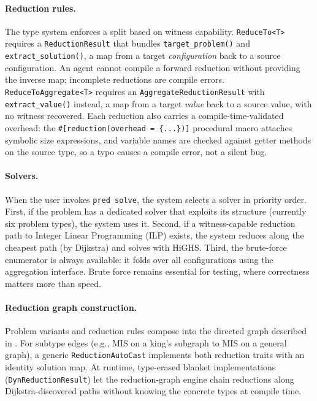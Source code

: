 \documentclass{article}
\begin{document}
\paragraph{Reduction rules.}
The type system enforces a split based on witness capability.
\texttt{ReduceTo<T>} requires a \texttt{ReductionResult} that bundles \texttt{target\_problem()} and \texttt{extract\_solution()}, a map from a target \emph{configuration} back to a source configuration.
An agent cannot compile a forward reduction without providing the inverse map; incomplete reductions are compile errors.
\texttt{ReduceToAggregate<T>} requires an \texttt{AggregateReductionResult} with \texttt{extract\_value()} instead, a map from a target \emph{value} back to a source value, with no witness recovered.
Each reduction also carries a compile-time-validated overhead: the \texttt{\#[reduction(overhead = \{...\})]} procedural macro attaches symbolic size expressions, and variable names are checked against getter methods on the source type, so a typo causes a compile error, not a silent bug.

\paragraph{Solvers.}
When the user invokes \texttt{pred solve}, the system selects a solver in priority order.
First, if the problem has a dedicated solver that exploits its structure (currently six problem types), the system uses it.
Second, if a witness-capable reduction path to Integer Linear Programming (ILP) exists, the system reduces along the cheapest path (by Dijkstra) and solves with HiGHS.
Third, the brute-force enumerator is always available: it folds over all configurations using the aggregation interface.
Brute force remains essential for testing, where correctness matters more than speed.

\paragraph{Reduction graph construction.}
Problem variants and reduction rules compose into the directed graph described in .
For subtype edges (e.g., MIS on a king's subgraph to MIS on a general graph), a generic \texttt{ReductionAutoCast} implements both reduction traits with an identity solution map.
At runtime, type-erased blanket implementations (\texttt{DynReductionResult}) let the reduction-graph engine chain reductions along Dijkstra-discovered paths without knowing the concrete types at compile time.
\end{document}
